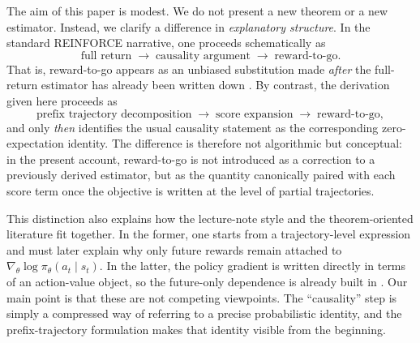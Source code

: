 \documentclass[11pt]{article}
\begin{document}
The aim of this paper is modest. We do not present a new theorem or a new estimator. Instead, we clarify a difference in \emph{explanatory structure}. In the standard REINFORCE narrative, one proceeds schematically as
\[
\text{full return} \;\longrightarrow\; \text{causality argument} \;\longrightarrow\; \text{reward-to-go}.
\]
That is, reward-to-go appears as an unbiased substitution made \emph{after} the full-return estimator has already been written down \cite{williams1992,spinningup,berkeley}. By contrast, the derivation given here proceeds as
\[
\text{prefix trajectory decomposition} \;\longrightarrow\; \text{score expansion} \;\longrightarrow\; \text{reward-to-go},
\]
and only \emph{then} identifies the usual causality statement as the corresponding zero-expectation identity. The difference is therefore not algorithmic but conceptual: in the present account, reward-to-go is not introduced as a correction to a previously derived estimator, but as the quantity canonically paired with each score term once the objective is written at the level of partial trajectories.

This distinction also explains how the lecture-note style and the theorem-oriented literature fit together. In the former, one starts from a trajectory-level expression and must later explain why only future rewards remain attached to $\nabla_\theta \log \pi_\theta(a_t\mid s_t)$. In the latter, the policy gradient is written directly in terms of an action-value object, so the future-only dependence is already built in \cite{sutton1999}. Our main point is that these are not competing viewpoints. The ``causality'' step is simply a compressed way of referring to a precise probabilistic identity, and the prefix-trajectory formulation makes that identity visible from the beginning.
\end{document}
